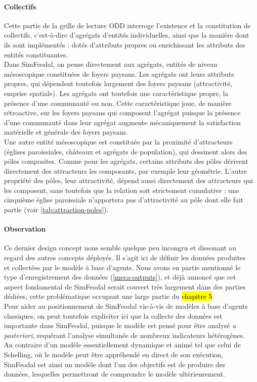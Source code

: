 \paragraph{Collectifs} Cette partie de la grille de lecture ODD interroge l'existence et la constitution de \og collectifs\fg{}, c'est-à-dire d'agrégats d'entités individuelles, ainsi que la manière dont ils sont implémentés : dotés
d'attributs propres ou enrichissant les attributs des entités constituantes.
\\
Dans SimFeodal, on pense directement aux agrégats, entités de niveau mésoscopique constituées de foyers paysans.
Les agrégats ont leurs attributs propres, qui dépendent toutefois largement des foyers paysans (attractivité, emprise spatiale).
Les agrégats ont toutefois une caractéristique propre, la présence d'une communauté ou non. Cette caractéristique joue, de manière rétroactive, sur les foyers paysans qui composent l'agrégat puisque la présence d'une communauté dans leur agrégat augmente mécaniquement la satisfaction matérielle et générale des foyers paysans.
\\
Une autre entité mésoscopique est constituée par la proximité d'attracteurs (églises paroissiales, châteaux et agrégats de population), qui dessinent alors des pôles composites.
Comme pour les agrégats, certains attributs des pôles dérivent directement des attracteurs les composants, par exemple leur géométrie. L'autre propriété des pôles, leur attractivité, dépend aussi directement des attracteurs qui les composent, sans toutefois que la relation soit strictement cumulative : une cinquième église paroissiale n'apportera pas d'attractivité au pôle dont elle fait partie (voir \cref{tab:attraction-poles}).

\paragraph{Observation} Ce dernier \og design concept\fg{} nous semble quelque peu incongru et dissonant au regard des autres concepts déployés. Il s'agit ici de définir les données produites et collectées par le modèle à base d'agents.
Nous avons en partie mentionné le type d'enregistrement des données (\cref{meca-outputs}), et déjà annoncé que cet aspect fondamental de SimFeodal serait couvert très largement dans des parties dédiées, cette problématique occupant une large partie du \hl{chapitre 5}.\\
Pour aider au positionnement de SimFeodal vis-à-vis de modèles à base d'agents classiques, on peut toutefois expliciter ici que la collecte des données est importante dans SimFeodal, puisque le modèle est pensé pour être analysé \textit{a posteriori}, requérant l'analyse simultanée de nombreux indicateurs hétérogènes. Au contraire d'un modèle essentiellement dynamique et \og animé\fg{} tel que celui de Schelling, où le modèle peut être appréhendé en direct de son exécution, SimFeodal est ainsi un modèle dont l'un des objectifs est de produire des données, lesquelles permettront de comprendre le modèle ultérieurement.



